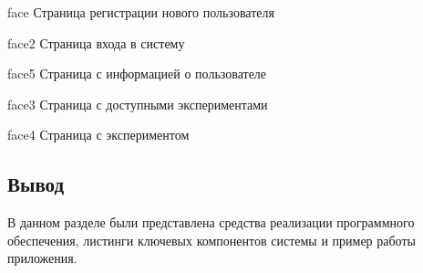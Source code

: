 \img{100mm}
{face}
{Страница регистрации нового пользователя}

\img{100mm}
{face2}
{Страница входа в систему}

\img{100mm}
{face5}
{Страница с информацией о пользователе}

\img{100mm}
{face3}
{Страница с доступными экспериментами}

\img{100mm}
{face4}
{Страница с экспериментом}

\clearpage

\subsection*{Вывод}
В данном разделе были представлена средства реализации программного обеспечения, листинги ключевых компонентов системы и пример работы приложения.


